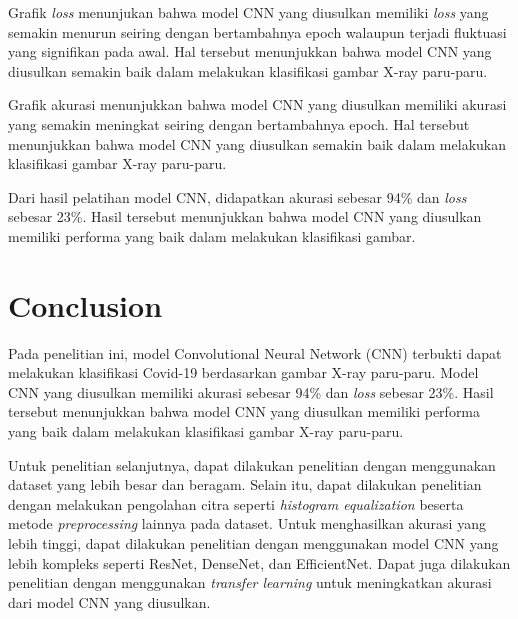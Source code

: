 \documentclass[conference]{IEEEtran}
\begin{document}
Grafik \textit{loss} menunjukan bahwa model CNN yang diusulkan memiliki \textit{loss} yang semakin menurun seiring dengan bertambahnya epoch walaupun terjadi fluktuasi yang signifikan pada awal. Hal tersebut menunjukkan bahwa model CNN yang diusulkan semakin baik dalam melakukan klasifikasi gambar X-ray paru-paru.

Grafik akurasi menunjukkan bahwa model CNN yang diusulkan memiliki akurasi yang semakin meningkat seiring dengan bertambahnya epoch. Hal tersebut menunjukkan bahwa model CNN yang diusulkan semakin baik dalam melakukan klasifikasi gambar X-ray paru-paru.

Dari hasil pelatihan model CNN, didapatkan akurasi sebesar 94\% dan \textit{loss} sebesar 23\%. Hasil tersebut menunjukkan bahwa model CNN yang diusulkan memiliki performa yang baik dalam melakukan klasifikasi gambar.

\section{Conclusion}
Pada penelitian ini, model Convolutional Neural Network (CNN) terbukti dapat melakukan klasifikasi Covid-19 berdasarkan gambar X-ray paru-paru. Model CNN yang diusulkan memiliki akurasi sebesar 94\% dan \textit{loss} sebesar 23\%. Hasil tersebut menunjukkan bahwa model CNN yang diusulkan memiliki performa yang baik dalam melakukan klasifikasi gambar X-ray paru-paru. 

Untuk penelitian selanjutnya, dapat dilakukan penelitian dengan menggunakan dataset yang lebih besar dan beragam. Selain itu, dapat dilakukan penelitian dengan melakukan pengolahan citra seperti \textit{histogram equalization} beserta metode \textit{preprocessing} lainnya pada dataset. Untuk menghasilkan akurasi yang lebih tinggi, dapat dilakukan penelitian dengan menggunakan model CNN yang lebih kompleks seperti ResNet, DenseNet, dan EfficientNet. Dapat juga dilakukan penelitian dengan menggunakan \textit{transfer learning} untuk meningkatkan akurasi dari model CNN yang diusulkan.
\end{document}
